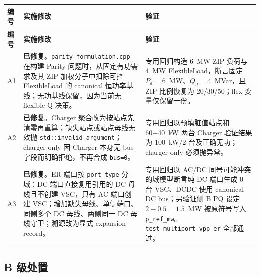 \documentclass[11pt,a4paper,fontset=fandol]{ctexart}
\newcommand{\file}[1]{\texttt{#1}}
\newcommand{\fixed}{\textcolor{hygreen}{\textbf{已修复}}}
\begin{document}
\begin{longtable}{@{}p{0.7cm}p{8.2cm}p{6.2cm}@{}}
\toprule
\textbf{编号} & \textbf{实施修改} & \textbf{验证}\\
\midrule
\endfirsthead
\toprule
\textbf{编号} & \textbf{实施修改} & \textbf{验证}\\
\midrule
\endhead
A1 & \fixed{}。\file{parity\_formulation.cpp} 在构建 Parity 问题时，从固定有功需求及其 ZIP 加权分子中扣除可控 FlexibleLoad 的 canonical 恒功率基线；无功基线保留，因为当前无 flexible-Q 决策。 & 专用回归构造 6~MW ZIP 负荷与 4~MW FlexibleLoad，断言固定 $P_d=6$~MW、$Q_d=4$~MVar，且 ZIP 比例恢复为 20/30/50；flex 变量仅保留一份。\\
A2 & \fixed{}。Charger 聚合改为按站点先清零再重算；缺失站点或站点母线无效抛 \file{std::invalid\_argument}；charger-only 因 Charger 本身无 bus 字段而明确拒绝，不再合成 \file{bus=0}。 & 专用回归以预填脏值站点和 60+40~kW 两台 Charger 验证结果为 100~kW/2 台及正确无功；charger-only 必须抛异常。\\
A3 & \fixed{}。ER 端口按 \file{port\_type} 分域：DC 端口直接复用引用的 DC 母线且不创建 VSC，只有 AC 端口创建 VSC；增加缺失母线、单侧端口、同侧多个 DC 母线、两侧同一 DC 母线守卫；溯源改为显式 expansion record。 & 专用回归以 AC/DC 同号可能冲突的域模型断言纯 DC 端口生成 0 台 VSC、DCDC 使用 canonical DC bus；另验证侧 B PQ 设定 $2-0.5=1.5$~MW 被原符号写入 \file{p\_ref\_mw}。\file{test\_multiport\_vpp\_er} 全部通过。\\
\bottomrule
\end{longtable}

\subsection{B 级处置}
\end{document}
